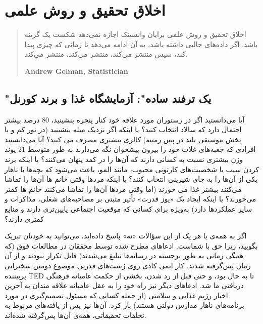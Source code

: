 

\chapter{اخلاق تحقیق و روش علمی}
\label{ch:اخلاق تحقیق و روش علمی}

\begin{quote}
    اخلاق تحقیق و روش علمی برایان وانسینک اجازه نمی‌دهد شکست یک گزینه باشد.
    اگر داده‌های جالبی داشته باشد، به آن ادامه می‌دهد تا زمانی که چیزی پیدا کند، سپس منتشر می‌کند، منتشر می‌کند، منتشر می‌کند.
    \begin{flushleft}
        \textenglish{\textbf{Andrew Gelman, Statistician}}
    \end{flushleft}
\end{quote}

{
\section*{"یک ترفند ساده": آزمایشگاه غذا و برند کورنل}
\label{sec:"یک ترفند ساده": آزمایشگاه غذا و برند کورنل}
آیا می‌دانستید اگر در رستوران مورد علاقه خود کنار پنجره بنشینید، 80 درصد بیشتر احتمال دارد که سالاد انتخاب کنید؟ یا اینکه اگر نزدیک میله بنشینید (در نور کم و با پخش موسیقی بلند در پس زمینه) کالری بیشتری مصرف می کنید؟ آیا می‌دانستید افرادی که جعبه‌های غلات خود را بیرون پیشخوان نگه می‌دارند به طور متوسط 21 پوند وزن بیشتری نسبت به کسانی دارند که آن‌ها را در کمد پنهان می‌کنند؟ یا اینکه برند کردن سیب با شخصیت‌های کارتونی محبوب، مانند المو، باعث می‌شود که بچه‌ها با ناهار یکی از آن‌ها را به جای شیرینی انتخاب کنند؟ یا اینکه مردها وقتی خانم ها آن‌ها را تماشا می‌کنند بیشتر غذا می خورند (اما وقتی مردها آن‌ها را تماشا می‌کنند خانم ها کمتر می‌خورند؟ یا اینکه ایجاد یک «پوز قدرت» تأثیر مثبتی بر مصاحبه‌های شغلی، مذاکرات و سایر عملکردها دارد) به‌ویژه برای کسانی که موقعیت اجتماعی پایین‌تری دارند و منابع کمتری دارند؟
}

اگر به همه‌ی یا هر یک از این سؤالات «نه» پاسخ داده‌اید، می‌توانید به خودتان تبریک بگویید، زیرا حق با شماست.
ادعاهای مطرح شده توسط محققان در مطالعات فوق (که همگی زمانی به طور برجسته در رسانه‌ها تبلیغ می‌شدند) قابل تکرار نبودند و از آن زمان پس‌گرفته شدند.
کار ایمی کادی روی ژست‌های قدرتی موضوع دومین سخنرانی پربیننده TED تا به حال بود، و حتی قبل از رد شدن، بخشی از حکمت عامیانه فرهنگی دریافتی ما شد.
ادعاهای دیگر نیز راه خود را به عقل عامیانه علاقه مندان به آخرین اخبار رژیم غذایی و سلامتی (از جمله کسانی که مسئول تصمیم‌گیری در مورد برنامه‌های ناهار مدارس دولتی هستند) باز کرد.
آن‌ها نیز پس از یافته‌های مربوط به تخلفات تحقیقاتی، همه‌ی آن‌ها پس‌گرفته شده‌اند.

